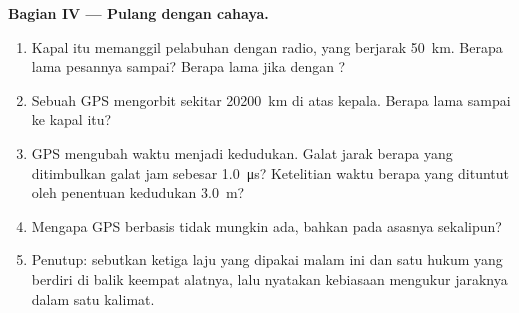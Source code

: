 \begin{problem}[{Soal akhir pekan --- membaca sinyal dunia: satu hukum,
$d = v\,t$, mengukur jarak badai, memetakan dasar laut, menghitung detak
jantung dan menyingkap cara kerja GPS}]
\medskip
\noindent\textbf{Bagian IV --- Pulang dengan cahaya.}
\begin{enumerate}[resume]
  \item Kapal itu memanggil pelabuhan dengan radio, yang berjarak
        \qty{50}{km}. Berapa lama pesannya sampai? Berapa lama jika
        dengan ?
  \item Sebuah  GPS mengorbit sekitar \qty{20200}{km} di atas
        kepala. Berapa lama  sampai ke kapal itu?
  \item GPS mengubah waktu menjadi kedudukan. Galat jarak berapa yang
        ditimbulkan galat jam sebesar \qty{1.0}{\micro s}? Ketelitian
        waktu berapa yang dituntut oleh penentuan kedudukan
        \qty{3.0}{m}?
  \item Mengapa GPS berbasis  tidak mungkin ada, bahkan pada
        asasnya sekalipun?
  \item Penutup: sebutkan ketiga laju yang dipakai malam ini dan satu
        hukum yang berdiri di balik keempat alatnya, lalu nyatakan
        kebiasaan mengukur jaraknya dalam satu kalimat.
\end{enumerate}
\end{problem}
